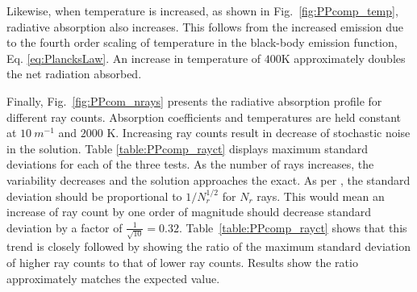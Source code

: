 Likewise, when temperature is increased, as shown in Fig.~\ref{fig:PPcomp_temp}, radiative absorption also increases. This follows from the increased emission due to the fourth order scaling of temperature in the black-body emission function, Eq. \ref{eq:PlancksLaw}.
An increase in temperature of $400$K approximately doubles the net radiation absorbed.

Finally, Fig.~\ref{fig:PPcom_nrays} presents the radiative absorption profile for different ray counts. Absorption coefficients and temperatures are held constant at $10~m^{-1}$ and $2000$ K.
Increasing ray counts result in decrease of stochastic noise in the solution. Table \ref{table:PPcomp_rayct} displays maximum standard deviations for each of the three tests. As the number of rays increases, the variability decreases and the solution approaches the exact. As per \citet{Modest2022ChapterExchange}, the standard deviation should be proportional to $1/N_r^{1/2}$ for $N_r$ rays. This would mean an increase of ray count by one order of magnitude should decrease standard deviation by a factor of $\frac{1}{\sqrt{10}} = 0.32$. Table~\ref{table:PPcomp_rayct} shows that this trend is closely followed by showing the ratio of the maximum standard deviation of higher ray counts to that of lower ray counts. Results show the ratio approximately matches the expected value.


